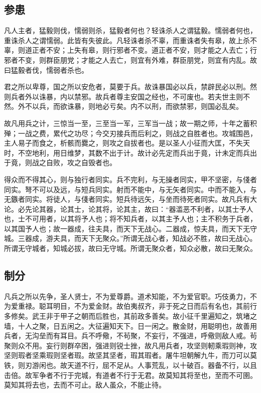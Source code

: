 \documentclass[]{article}
\begin{document}
\hypertarget{header-n392}{%
\subsection{参患}\label{header-n392}}

凡人主者，猛毅则伐，懦弱则杀，猛毅者何也？轻诛杀人之谓猛毅。懦弱者何也，重诛杀人之谓懦弱。此皆有失彼此。凡轻诛者杀不辜，而重诛者失有皋，故上杀不辜，则道正者不安；上失有皋，则行邪者不变。道正者不安，则才能之人去亡；行邪者不变，则群臣朋党；才能之人去亡，则宜有外难，群臣朋党，则宜有内乱。故曰猛毅者伐，懦弱者杀也。

君之所以卑尊，国之所以安危者，莫要于兵。故诛暴国必以兵，禁辟民必以刑。然则兵者外以诛暴，内以禁邪。故兵者尊主安国之经也，不可废也。若夫世主则不然。外不以兵，而欲诛暴，则地必亏矣。内不以刑，而欲禁邪，则国必乱矣。

故凡用兵之计，三惊当一至，三至当一军，三军当一战；故一期之师，十年之蓄积殚；一战之费，累代之功尽；今交刃接兵而后利之，则战之自胜者也。攻城围邑，主人易子而食之，析骸而爨之，则攻之自拔者也。是以圣人小征而大匡，不失天时，不空地利，用日维梦，其数不出于计。故计必先定而兵出于竟，计未定而兵出于竟，则战之自败，攻之自毁者也。

得众而不得其心，则与独行者同实。兵不完利，与无操者同实，甲不坚密，与俴者同实。弩不可以及远，与短兵同实。射而不能中，与无矢者同实。中而不能入，与无鏃者同实。将徒人，与俴者同实。短兵待远矢，与坐而待死者同实。故凡兵有大论。必先论其器，论其士，论其将，论其主，故曰：``器滥恶不利者，以其士予人也，士不可用者，以其将予人也；将不知兵者，以其主予人也；主不积务于兵者，以其国予人也；故一器成，往夫具，而天下无战心。二器成，惊夫具，而天下无守城。三器成，游夫具，而天下无聚众。''所谓无战心者，知战必不胜，故曰无战心。所谓无守城者，知城必拔，故曰无守城。所谓无聚众者，知众必散，故曰无聚众。

\hypertarget{header-n399}{%
\subsection{制分}\label{header-n399}}

凡兵之所以先争，圣人贤士，不为爱尊爵。道术知能，不为爱官职。巧伎勇力，不为爱重禄。聪耳明目，不为爱金财。故伯夷叔齐，非于死之日而后有名也，其前行多修矣。武王非于甲子之朝而后胜也，其前政多善矣。故小征千里遍知之，筑堵之墙，十人之聚，日五闲之。大征遍知天下。日一闲之。散金财，用聪明也，故善用兵者，无沟垒而有耳目。兵不呼儆，不茍聚，不妄行，不强进，呼儆则敌人戒。茍聚则众不用。妄行则群卒困，强进则锐士挫，故凡用兵者，攻坚则軔乘瑕则神，攻坚则瑕者坚乘瑕则坚者瑕。故坚其坚者，瑕其瑕者。屠牛坦朝解九牛，而刀可以莫铁，则刃游闲也。故天道不行，屈不足从。人事荒乱，以十破百。器备不行，以且击倍。故军争者不行于完城，有道者不行于无君。故莫知其将至也，至而不可圉。莫知其将去也，去而不可止。敌人虽众，不能止待。
\end{document}
